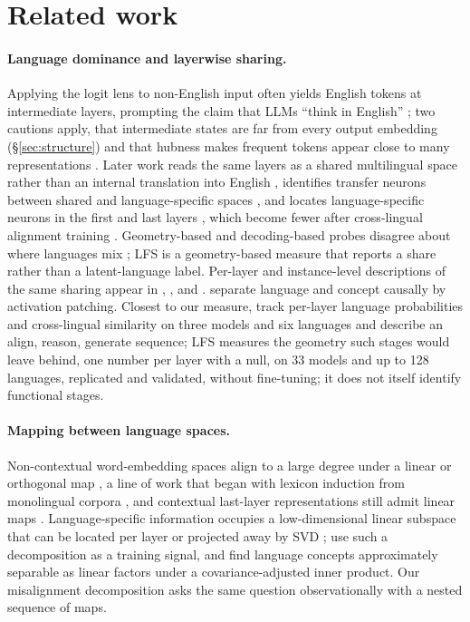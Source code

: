 \documentclass{article} %
\begin{document}
\section{Related work}
\label{sec:related}

\paragraph{Language dominance and layerwise sharing.} Applying the logit lens
\citep{nostalgebraist2020lens} to non-English input often yields English
tokens at intermediate layers, prompting the claim that LLMs ``think in
English'' \citep{wendler2024llamas}; two cautions apply, that intermediate states are far from every output embedding (\S\ref{sec:structure}) and that hubness makes frequent tokens appear close to many representations \citep{radovanovic2010hubs,artetxe2017almost}. Later work reads the same layers as a shared multilingual space rather than an internal translation into English \citep{shani2025dominance,bafna2025translation}, identifies transfer neurons between shared and language-specific spaces \citep{tezuka2025transfer}, and locates language-specific neurons in the first and last layers \citep{zhao2024multilingualism,xu2025neurons,kojima2024neurons,tang2024neurons}, which become fewer after cross-lingual alignment training \citep{zhang2026neurons}. Geometry-based and decoding-based probes disagree about where languages mix \citep{bayazit2026lingua}; LFS is a geometry-based measure that reports a share rather than a latent-language label. Per-layer and instance-level descriptions of the same sharing appear in \citet{sakajo2026structural}, \citet{wilie2025interlingual}, and \citet{ravisankar2025map}.
\citet{dumas2025tongue} separate language and concept causally by activation patching. Closest to our measure, \citet{tamo2026linguamap} track per-layer language probabilities and cross-lingual similarity on three models and six languages and describe an align, reason, generate sequence; LFS measures the geometry such stages would leave behind, one number per layer with a null, on 33 models and up to 128 languages, replicated and validated, without fine-tuning; it does not itself identify functional stages.

\paragraph{Mapping between language spaces.} Non-contextual word-embedding
spaces align to a large degree under a linear or orthogonal map
\citep{conneau2018word,marchisio2021euclidean,marchisio2022isovec}, a line of work that began with lexicon induction from monolingual corpora \citep{koehn2002lexicon}, and contextual last-layer representations still admit
linear maps \citep{peng2024linear}. Language-specific information occupies a low-dimensional linear subspace that can be located per layer \citep{liang2021locating} or projected away by SVD \citep{xie2022lowrank}; \citet{zhao2025lens} use such a decomposition as a training signal, and \citet{marinov2026separability} find language concepts approximately separable as linear factors under a covariance-adjusted inner product. Our misalignment decomposition asks the same question observationally with a nested sequence of maps.
\end{document}
